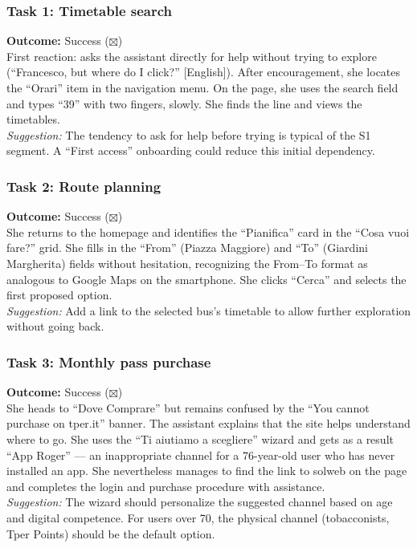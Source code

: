 ﻿\documentclass[11pt,a4paper]{article}
\begin{document}
\begin{tcolorbox}[base]

\subsubsection*{Task 1: Timetable search}
\noindent\textbf{Outcome:} Success ($\boxtimes$)\\[0.2cm]
First reaction: asks the assistant directly for help without
trying to explore (``Francesco, but where do I click?'' [English]). After
encouragement, she locates the ``Orari'' item in the
navigation menu. On the page, she uses the
search field and types ``39'' with two fingers, slowly. She finds the
line and views the timetables.\\[0.2cm]
\textit{Suggestion:} The tendency to ask for help before
trying is typical of the S1 segment. A ``First
access'' onboarding could reduce this initial dependency.

\vspace{0.3cm}

\subsubsection*{Task 2: Route planning}
\noindent\textbf{Outcome:} Success ($\boxtimes$)\\[0.2cm]
She returns to the homepage and identifies the ``Pianifica'' card in the
``Cosa vuoi fare?'' grid. She fills in the ``From'' (Piazza
Maggiore) and ``To'' (Giardini Margherita) fields without hesitation,
recognizing the From--To format as analogous to Google Maps
on the smartphone. She clicks ``Cerca'' and selects the first
proposed option.\\[0.2cm]
\textit{Suggestion:} Add a link to the selected bus's timetable
to allow further exploration without going
back.

\vspace{0.3cm}

\subsubsection*{Task 3: Monthly pass purchase}
\noindent\textbf{Outcome:} Success ($\boxtimes$)\\[0.2cm]
She heads to ``Dove Comprare'' but remains confused by the
``You cannot purchase on tper.it'' banner. The assistant
explains that the site helps understand where to go. She uses the
``Ti aiutiamo a scegliere'' wizard and gets as a result
``App Roger'' --- an inappropriate channel for a
76-year-old user who has never installed an app. She nevertheless manages
to find the link to solweb on the page and completes the
login and purchase procedure with assistance.\\[0.2cm]
\textit{Suggestion:} The wizard should personalize the
suggested channel based on age and digital competence.
For users over 70, the physical channel (tobacconists, Tper
Points) should be the default option.


\end{tcolorbox}
\end{document}
